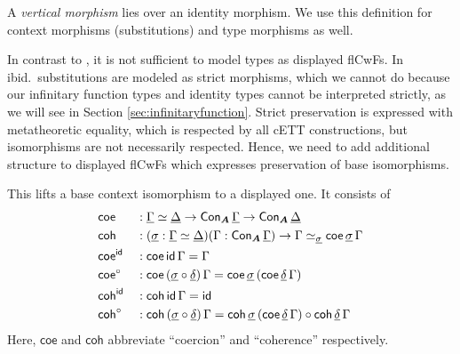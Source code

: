 \documentclass[sigplan,review,anonymous]{acmart}\settopmatter{printfolios=true,printccs=false,printacmref=false}
\newcommand{\bA}{\boldsymbol{A}}
\newcommand{\ul}[1]{\underline{#1}}
\newcommand{\ulGamma}{\ul{\Gamma}}
\newcommand{\ulDelta}{\ul{\Delta}}
\newcommand{\uldelta}{\ul{\delta}}
\newcommand{\ulsigma}{\ul{\sigma}}
\newcommand{\coe}{\mathsf{coe}}
\newcommand{\coh}{\mathsf{coh}}
\begin{document}
\begin{definition} A \emph{vertical morphism} lies over an identity morphism. We use this definition for context morphisms (substitutions) and type morphisms as well.
\end{definition}

In contrast to \cite{kaposi2019constructing}, it is not sufficient to model
types as displayed flCwFs. In ibid.\ substitutions are modeled as strict
morphisms, which we cannot do because our infinitary function types and identity
types cannot be interpreted strictly, as we will see in Section
\ref{sec:infinitaryfunction}. Strict preservation is expressed with metatheoretic equality, which
is respected by all cETT constructions, but isomorphisms are not necessarily
respected. Hence, we need to add additional structure to displayed flCwFs which
expresses preservation of base isomorphisms.

\begin{definition} This lifts a base context isomorphism to a displayed one. It consists of
\begin{alignat*}{3}
  & \coe &&: \ulGamma \simeq \ulDelta \ra \Con_{\bA}\,\ulGamma \ra \Con_{\bA}\,\ulDelta\\
  & \coh &&: (\ulsigma : \ulGamma \simeq \ulDelta)(\Gamma : \Con_{\bA}\,\ulGamma)
           \ra \Gamma \simeq_{\ulsigma} \coe\,\ulsigma\,\Gamma\\
  & \coe^{\id} && : \coe\,\id\,\Gamma = \Gamma\\
  & \coe^{\circ} && : \coe\,(\ulsigma\circ\uldelta)\,\Gamma = \coe\,\ulsigma\,(\coe\,\uldelta\,\Gamma)\\
  & \coh^{\id} && : \coh\,\id\,\Gamma = \id\\
  & \coh^{\circ} && : \coh\,(\ulsigma\circ\uldelta)\,\Gamma = \coh\,\ulsigma\,(\coe\,\uldelta\,\Gamma)
          \circ \coh\,\uldelta\,\Gamma
\end{alignat*}
Here, $\coe$ and $\coh$ abbreviate ``coercion'' and ``coherence'' respectively.
\end{definition}
\end{document}
